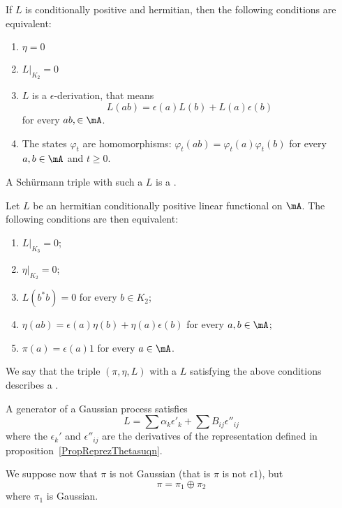 \begin{proposition}
	If $L$ is conditionally positive and hermitian, then the following conditions are equivalent:
	\begin{enumerate}
		\item
		      $\eta=0$
		\item
		      $L|_{K_2}=0$
		\item
		      $L$ is a $\epsilon$-derivation, that means
		      \begin{equation}
			      L(ab)=\epsilon(a)L(b)+L(a)\epsilon(b)
		      \end{equation}
		      for every $ab,\in\mA$.
		\item
		      The states $\varphi_t$ are homomorphisms: $\varphi_t(ab)=\varphi_t(a)\varphi_t(b)$ for every $a,b\in\mA$ and $t\geq 0$.
	\end{enumerate}
\end{proposition}
A Schürmann triple with such a $L$ is a .

\begin{proposition}     \label{PropProcessusGaussien}
	Let $L$ be an hermitian conditionally positive linear functional on $\mA$. The following conditions are then equivalent:
	\begin{enumerate}
		\item
		      $L|_{K_3}=0$;
		\item
		      $\eta|_{K_2}=0$;
		\item
		      $L(b^*b)=0$ for every $b\in K_2$;
		\item
		      $\eta(ab)=\epsilon(a)\eta(b)+\eta(a)\epsilon(b)$ for every $a,b\in\mA$;
		\item
		      $\pi(a)=\epsilon(a)1$ for every $a\in\mA$.
	\end{enumerate}
\end{proposition}
We say that the triple $(\pi,\eta,L)$ with a $L$ satisfying the above conditions describes a .

\begin{proposition}
	A generator of a Gaussian process satisfies
	\begin{equation}
		L=\sum\alpha_k\epsilon'_k+\sum B_{ij}\epsilon''_{ij}
	\end{equation}
	where the $\epsilon_k'$ and $\epsilon''_{ij}$ are the derivatives of the representation defined in proposition~\ref{PropReprezThetasuqn}.
\end{proposition}

We suppose now that $\pi$ is not Gaussian (that is $\pi$ is not $\epsilon 1$), but
\begin{equation}
	\pi=\pi_1\oplus\pi_2
\end{equation}
where $\pi_1$ is Gaussian.

